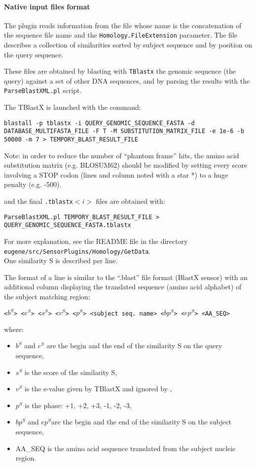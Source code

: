 \paragraph{Native input files format}

The plugin reads information from the file whose name is the concatenation 
of the sequence file name and the \texttt{Homology.FileExtension} parameter. 
The file describes a collection of similarities sorted by subject sequence 
and by position on the query sequence.

These files are obtained by blasting with \texttt{TBlastx} the genomic
sequence (the query) against a set of other DNA sequences, and by
parsing the results with the \texttt{ParseBlastXML.pl} script.

The TBlastX is launched with the command:

\begin{Verbatim}[fontsize=\small]
blastall -p tblastx -i QUERY_GENOMIC_SEQUENCE_FASTA -d
DATABASE_MULTIFASTA_FILE -F T -M SUBSTITUTION_MATRIX_FILE -e 1e-6 -b
50000 -m 7 > TEMPORY_BLAST_RESULT_FILE
\end{Verbatim}

Note: in order to reduce the number of ``phantom frame'' hits, the
amino acid substitution matrix (e.g. BLOSUM62) should be modified by
setting every score involving a STOP codon (lines and column noted
with a star *) to a huge penalty (e.g. -500).

and the final \texttt{.tblastx}$<i>$ files are obtained with:
\begin{Verbatim}[fontsize=\small]
ParseBlastXML.pl TEMPORY_BLAST_RESULT_FILE > QUERY_GENOMIC_SEQUENCE_FASTA.tblastx
\end{Verbatim}

For more explanation, see the README file in the directory\\
\texttt{eugene/src/SensorPlugins/Homology/GetData}.\\

One similarity S is described per line.

The format of a line is similar to the ``.blast'' file format (BlastX
sensor) with an additional column displaying the translated sequence
(amino acid alphabet) of the subject matching region:

\texttt{<$b^S$> <$e^S$> <$s^S$> <$v^S$> <$p^S$> <subject seq. name> <$bp^S$> <$ep^S$> <AA\_SEQ>}

where:
\begin{itemize}
\item $b^S$ and $e^S$ are the begin and the end of the similarity S on the query sequence,
\item $s^S$ is the score of the similarity S,
\item $v^S$ is the e-value given by TBlastX and ignored by \EuGene,
\item $p^S$ is the phase: +1, +2, +3, -1, -2, -3,
\item $bp^S$ and $ep^S$are the begin and the end of the similarity S on the subject sequence,
\item AA\_SEQ is the amino acid sequence translated from the subject nucleic region.
\end{itemize}

